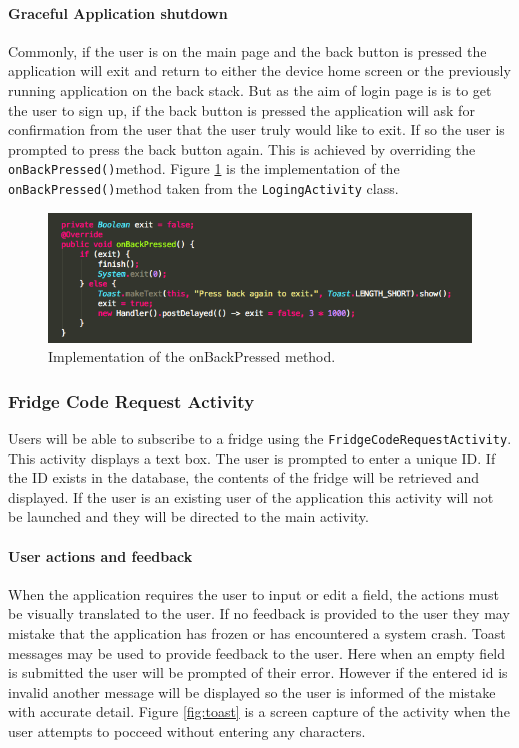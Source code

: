 \documentclass[a4paper, 11pt]{article}
\begin{document}
\paragraph{Graceful Application shutdown}
Commonly, if the user is on the main page and the back button is pressed the application will exit and return to either the device home screen or the previously running application on the back stack. But as the aim of login page is is to get the user to sign up, if the back button is pressed the application will ask for confirmation from the user that the user truly would like to exit. If so the user is prompted to press the back button again. This is achieved by overriding the \texttt{onBackPressed()}method. Figure \ref{fig:onBack} is the implementation of the  \texttt{onBackPressed()}method taken from the  \texttt{LogingActivity} class.

\vspace{\baselineskip}

\begin{figure}[h]
\centering
\includegraphics[width=\textwidth]{onBack}
\caption{Implementation of the onBackPressed method.} \label{fig:onBack}
\end{figure}


\subsubsection{Fridge Code Request Activity}
Users will be able to subscribe to a fridge using the \texttt{FridgeCodeRequestActivity}. This activity displays a text box. The user is prompted to enter a unique ID. If the ID exists in the database, the contents of the fridge will be retrieved and displayed. If the user is an existing user of the application this activity will not be launched and they will be directed to the main activity.

\paragraph{User actions and feedback}
When the application requires the user to input or edit a field, the actions must be visually translated to the user. If no feedback is provided to the user they may mistake that the application has frozen or has encountered a system crash. Toast messages may be used to provide feedback to the user. Here when an empty field is submitted the user will be prompted of their error. However if the entered id is invalid another message will be displayed so the user is informed of the mistake with accurate detail. Figure \ref{fig:toast} is a screen capture of the activity when the user attempts to pocceed without entering any characters. 
\end{document}
